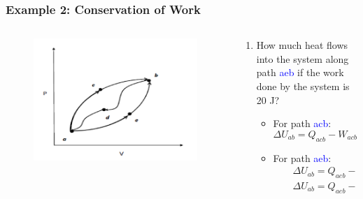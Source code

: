 \documentclass[10pt,compress]{beamer}
\begin{document}
\begin{frame}
 \frametitle{Example 2: Conservation of Work}
 \scriptsize
 \begin{columns}
  \begin{column}[r]{0.5\linewidth}
   \begin{figure}%
    \begin{center}
     \includegraphics[width=\columnwidth,clip]{./../Pics/First_Law_1}
    \end{center}
   \end{figure}
  \end{column}
  \begin{column}[r]{0.5\linewidth}
   \begin{enumerate}
    \item<2-> How much heat flows into the system along path \textcolor{blue}{aeb} if the work done by the system is 20 J?
       \begin{itemize}\scriptsize
         \item<3-> For path \textcolor{blue}{acb}:
           \begin{displaymath}
             \Delta U_{ab} = Q_{acb}-W_{acb} = 100 - 40 = 60 J
            \end{displaymath}
          \item<4-> For path \textcolor{blue}{aeb}:
            \begin{eqnarray}
              &&\Delta U_{ab} = Q_{aeb}-W_{aeb} = 60 J \nonumber \\
              &&\Delta U_{ab} = Q_{aeb}-20 \therefore Q_{aeb} = 80 J \nonumber
            \end{eqnarray}
       \end{itemize}


\end{enumerate}
\end{column}
\end{columns}
\end{frame}
\end{document}
